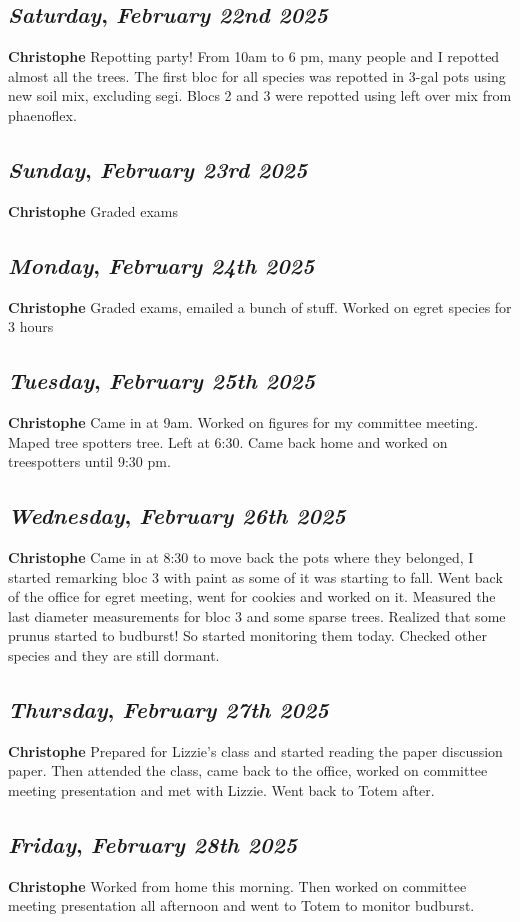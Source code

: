 \def\day{\textit{February 22nd 2025}}
\def\weekday{\textit{Saturday}}
\subsection*{\weekday, \day}
\textbf {Christophe}
Repotting party! From 10am to 6 pm, many people and I repotted almost all the trees. The first bloc for all species was repotted in 3-gal pots using new soil mix, excluding segi. Blocs 2 and 3 were repotted using left over mix from phaenoflex. 

\def\day{\textit{February 23rd 2025}}
\def\weekday{\textit{Sunday}}
\subsection*{\weekday, \day}
\textbf {Christophe}
Graded exams
\def\day{\textit{February 24th 2025}}
\def\weekday{\textit{Monday}}
\subsection*{\weekday, \day}
\textbf {Christophe}
Graded exams, emailed a bunch of stuff. Worked on egret species for 3 hours

\def\day{\textit{February 25th 2025}}
\def\weekday{\textit{Tuesday}}
\subsection*{\weekday, \day}
\textbf {Christophe}
Came in at 9am. Worked on figures for my committee meeting. Maped tree spotters tree. Left at 6:30. Came back home and worked on treespotters until 9:30 pm. 

\def\day{\textit{February 26th 2025}}
\def\weekday{\textit{Wednesday}}
\subsection*{\weekday, \day}
\textbf {Christophe}
Came in at 8:30 to move back the pots where they belonged, I started remarking bloc 3 with paint as some of it was starting to fall. Went back of the office for egret meeting, went for cookies and worked on it. Measured the last diameter measurements for bloc 3 and some sparse trees. Realized that some prunus started to budburst! So started monitoring them today. Checked other species and they are still dormant. 

\def\day{\textit{February 27th 2025}}
\def\weekday{\textit{Thursday}}
\subsection*{\weekday, \day}
\textbf {Christophe}
Prepared for Lizzie's class and started reading the paper discussion paper. Then attended the class, came back to the office, worked on committee meeting presentation and met with Lizzie. Went back to Totem after.

\def\day{\textit{February 28th 2025}}
\def\weekday{\textit{Friday}}
\subsection*{\weekday, \day}
\textbf {Christophe}
Worked from home this morning. Then worked on committee meeting presentation all afternoon and went to Totem to monitor budburst. 
